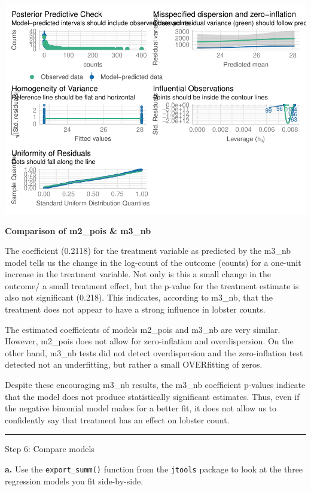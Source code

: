 \documentclass[
]{article}
\begin{document}
\includegraphics{hw1-lobstrs-eds241_files/figure-latex/unnamed-chunk-28-1.pdf}

\textbf{Comparison of m2\_pois \& m3\_nb}

The coefficient (0.2118) for the treatment variable as predicted by the
m3\_nb model tells us the change in the log-count of the outcome
(counts) for a one-unit increase in the treatment variable. Not only is
this a small change in the outcome/ a small treatment effect, but the
p-value for the treatment estimate is also not significant (0.218). This
indicates, according to m3\_nb, that the treatment does not appear to
have a strong influence in lobster counts.

The estimated coefficients of models m2\_pois and m3\_nb are very
similar. However, m2\_pois does not allow for zero-inflation and
overdispersion. On the other hand, m3\_nb tests did not detect
overdispersion and the zero-inflation test detected not an underfitting,
but rather a small OVERfitting of zeros.

Despite these encouraging m3\_nb results, the m3\_nb coefficient
p-values indicate that the model does not produce statistically
significant estimates. Thus, even if the negative binomial model makes
for a better fit, it does not allow us to confidently say that treatment
has an effect on lobster count.

\begin{center}\rule{0.5\linewidth}{0.5pt}\end{center}

Step 6: Compare models

\textbf{a.} Use the \texttt{export\_summ()} function from the
\texttt{jtools} package to look at the three regression models you fit
side-by-side.
\end{document}
